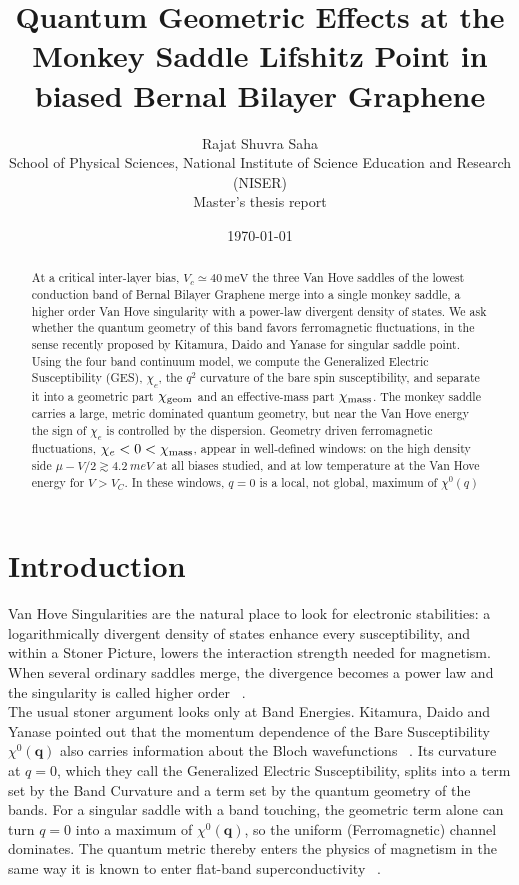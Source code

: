 \documentclass[11pt,a4paper]{article}
\title{\textbf{Quantum Geometric Effects at the Monkey Saddle Lifshitz Point in biased Bernal Bilayer Graphene}}
\author{Rajat Shuvra Saha\\[2pt]
\small School of Physical Sciences, National Institute of Science Education and Research (NISER)\\
\small Master's thesis report}
\date{\today}
\numberwithin{equation}{section}
\newcommand{\bq}{\mathbf{q}}
\newcommand{\chie}{\chi_{e}}
\newcommand{\chig}{\chi_{\rm geom}}
\newcommand{\chim}{\chi_{\rm mass}}
\newcommand{\meV}{\,\mathrm{meV}}
\begin{document}
\maketitle

\begin{abstract}
\noindent
At a critical inter-layer bias, $V_c\simeq 40\meV$ the three Van Hove saddles of the lowest conduction band of Bernal Bilayer Graphene merge into a single monkey saddle, a higher order Van Hove singularity with a power-law divergent density of states. We ask whether the quantum geometry of this band favors ferromagnetic fluctuations, in the sense recently proposed by Kitamura, Daido and Yanase for singular saddle point. Using the four band continuum model, we compute the Generalized Electric Susceptibility (GES), $\chie$, the $q^2$ curvature of the bare spin susceptibility, and separate it into a geometric part $\chig$ and an effective-mass part $\chim$. The monkey saddle carries a large, metric dominated quantum geometry, but near the Van Hove energy the sign of $\chie$ is controlled by the dispersion. Geometry driven ferromagnetic fluctuations, $\chie<0<\chim$, appear in well-defined windows: on the high density side $\mu-V/2\gtrsim 4.2\ meV$ at all biases studied, and at low temperature at the Van Hove energy for $V>V_C$. In these windows, $q=0$ is a local, not global, maximum of $\chi^0 (q)$
\end{abstract}

\section*{Introduction}

Van Hove Singularities are the natural place to look for electronic stabilities: a logarithmically divergent density of states enhance every susceptibility, and within a Stoner Picture, lowers the interaction strength needed for magnetism. When several ordinary saddles merge, the divergence becomes a power law and the singularity is called higher order ~\cite{Yuan2019,Shtyk2017}.\\

The usual stoner argument looks only at Band Energies. Kitamura, Daido and Yanase pointed out that the momentum dependence of the Bare Susceptibility $\chi^0(\bq)$ also carries information about the Bloch wavefunctions ~\cite{Kitamura2024}. Its curvature at $q=0$, which they call the Generalized Electric Susceptibility, splits into a term set by the Band Curvature and a term set by the quantum geometry of the bands. For a singular saddle with a band touching, the geometric term alone can turn $q=0$ into a maximum of $\chi^0(\bq)$, so the uniform (Ferromagnetic) channel dominates. The quantum metric thereby enters the physics of magnetism in the same way it is known to enter flat-band superconductivity  ~\cite{Torma2022}.\\
\end{document}
